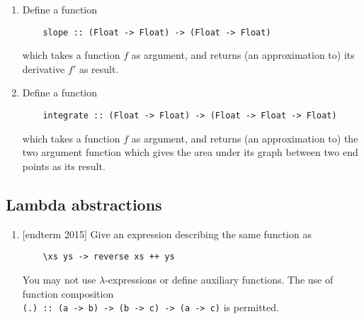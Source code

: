 \documentclass{article}
\begin{document}
\begin{enumerate}
\item \cite[p. 252]{thompson} Define a function
\begin{verbatim}
    slope :: (Float -> Float) -> (Float -> Float)
\end{verbatim}
which takes a function $f$ as argument, and returns (an approximation to) its derivative $f'$ as result.

\item \cite[p. 252]{thompson} Define a function
\begin{verbatim}
    integrate :: (Float -> Float) -> (Float -> Float -> Float)
\end{verbatim}
which takes a function $f$ as argument, and returns (an approximation to) the two argument function which gives the area under its graph between two end points as its result.
\end{enumerate}

\subsection{Lambda abstractions}
\begin{enumerate}
\item {[endterm 2015]} Give an expression describing the same function as
\begin{verbatim}
    \xs ys -> reverse xs ++ ys
\end{verbatim}
You may not use $\lambda$-expressions or define auxiliary functions. The use of function composition \\ \verb|(.) :: (a -> b) -> (b -> c) -> (a -> c)| is permitted.
\end{enumerate}
\end{document}
